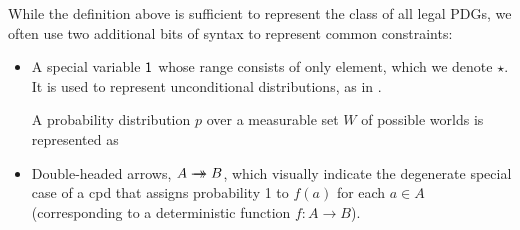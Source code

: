\documentclass[letterpaper]{article} %
\theoremstyle{plain}
\theoremstyle{definition}
\theoremstyle{remark}
\newcommand{\tto}{\rightarrow\mathrel{\mspace{-15mu}}\rightarrow}
\begin{document}
	While the definition above is sufficient to represent the class of all legal PDGs,
	we often use two additional bits of syntax to represent common constraints:  
	\begin{itemize}
	\item A special variable $\sf 1$ 
whose range consists of only element, which we denote $\star$.
It is used to represent
          unconditional distributions, as in
                  .  
	\begin{vleftovers}
		\begin{examplex}\label{ex:worldsonly}
			A probability distribution $p$ over a measurable set $W$ of possible worlds is represented as 
			\begin{center}
			\end{center}
		\end{examplex}
	\end{vleftovers}
		\item Double-headed arrows, $A \tto
                  B$, which visually indicate the degenerate special
                  case of a cpd that assigns probability 1 to $f(a)$
                  for each $a \in A$ (corresponding to a deterministic
                  function $f : A \to B$). 
	\end{itemize}
\end{document}
